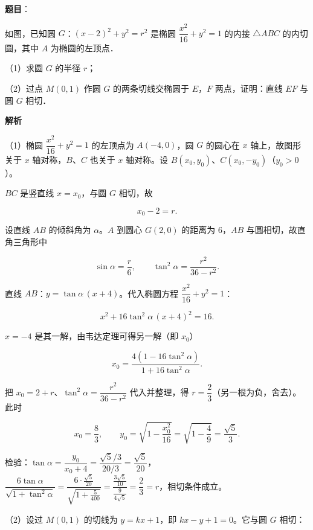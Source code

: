 \begin{answer}

\textbf{题目}：

如图，已知圆 $G$：$(x-2)^2+y^2=r^2$ 是椭圆 $\dfrac{x^2}{16}+y^2=1$ 的内接 $\triangle ABC$ 的内切圆，其中 $A$ 为椭圆的左顶点．

（1）求圆 $G$ 的半径 $r$；

（2）过点 $M(0,1)$ 作圆 $G$ 的两条切线交椭圆于 $E$，$F$ 两点，证明：直线 $EF$ 与圆 $G$ 相切．
\nopagebreak[4]
\begin{center}\end{center}
\nopagebreak[4]
\textbf{解析}

（1）椭圆 $\dfrac{x^2}{16}+y^2=1$ 的左顶点为 $A(-4,0)$，圆 $G$ 的圆心在 $x$ 轴上，故图形关于 $x$ 轴对称，$B$、$C$ 也关于 $x$ 轴对称。设 $B(x_0,y_0)$、$C(x_0,-y_0)$（$y_0>0$）。

$BC$ 是竖直线 $x=x_0$，与圆 $G$ 相切，故

\nopagebreak[4]
\[x_0-2=r.\]

设直线 $AB$ 的倾斜角为 $\alpha$。$A$ 到圆心 $G(2,0)$ 的距离为 $6$，$AB$ 与圆相切，故直角三角形中

\nopagebreak[4]
\[\sin\alpha=\frac{r}{6},\qquad \tan^2\alpha=\frac{r^2}{36-r^2}.\]

直线 $AB$：$y=\tan\alpha\,(x+4)$。代入椭圆方程 $\dfrac{x^2}{16}+y^2=1$：

\nopagebreak[4]
\[x^2+16\tan^2\alpha\,(x+4)^2=16.\]

$x=-4$ 是其一解，由韦达定理可得另一解（即 $x_0$）

\nopagebreak[4]
\[x_0=\frac{4(1-16\tan^2\alpha)}{1+16\tan^2\alpha}.\]

把 $x_0=2+r$、$\tan^2\alpha=\dfrac{r^2}{36-r^2}$ 代入并整理，得 $r=\dfrac23$（另一根为负，舍去）。此时

\nopagebreak[4]
\[x_0=\frac83,\qquad y_0=\sqrt{1-\frac{x_0^2}{16}}=\sqrt{1-\frac49}=\frac{\sqrt5}{3}.\]

检验：$\tan\alpha=\dfrac{y_0}{x_0+4}=\dfrac{\sqrt5/3}{20/3}=\dfrac{\sqrt5}{20}$，$\dfrac{6\tan\alpha}{\sqrt{1+\tan^2\alpha}}=\dfrac{6\cdot\frac{\sqrt5}{20}}{\sqrt{1+\frac5{400}}}=\dfrac{\frac{3\sqrt5}{10}}{\frac{9}{4\sqrt5}}=\dfrac23=r$，相切条件成立。

（2）设过 $M(0,1)$ 的切线为 $y=kx+1$，即 $kx-y+1=0$。它与圆 $G$ 相切：


\end{answer}
